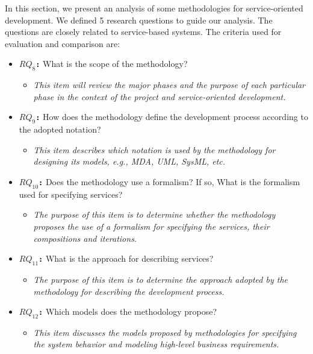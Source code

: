 In this section, we present an analysis of some methodologies for
service-oriented development. We defined 5 research questions to guide our analysis. The questions are closely related to service-based
systems. The criteria used for evaluation and comparison are:






\begin{itemize} 

 \item \textbf{\texttt{$RQ_8$:}} What is the scope of the methodology?
 	\begin{itemize}
	  \item \textit{This item will review the major phases and
  the purpose of each particular phase in the context of the project and
  service-oriented development.}
	\end{itemize}
  \item \textbf{\texttt{$RQ_9$:}} 
  How does the methodology define the development process according to the
  adopted notation?
  \begin{itemize}
	  \item \textit{This item describes which notation is used by the methodology
	  for designing its models, e.g., MDA, UML, SysML, etc.}
	\end{itemize}	
  \item \textbf{\texttt{$RQ_{10}$:}} Does the methodology use a formalism?
  If so, What is the formalism used for specifying services? 
\begin{itemize}
	  \item \textit{ The purpose of this item is to determine whether the
	  methodology proposes the use of a formalism for specifying
  the services, their compositions and iterations.}
	\end{itemize}  
  \item \textbf{\texttt{$RQ_{11}$:}} What is the approach for describing
  services?
\begin{itemize}
	  \item \textit{ The purpose of this item is to determine the approach
	  adopted by the methodology for describing the development process.}
	\end{itemize}
	  \item \textbf{\texttt{$RQ_{12}$:}} Which models does the methodology
	  propose?
	\begin{itemize}
	  \item \textit{This item discusses the models proposed by
  methodologies for specifying the system behavior and modeling
  high-level business requirements.}
	\end{itemize} 
\end{itemize}


